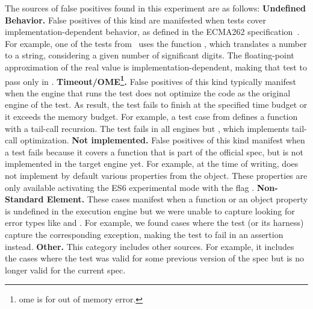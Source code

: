 \documentclass[10pt,conference,anonymous]{IEEEtran}
\begin{document}
The sources of false positives found in this experiment are as
follows: \textbf{Undefined Behavior.} False positives of this kind are
manifested when tests cover implementation-dependent behavior, as
defined in the ECMA262 specification~\cite{ecmas262-spec}. For
example, one of the tests from \jerry\ uses the function
, which translates a number to
a string, considering a given number of significant digits. The
floating-point approximation of the real value is
implementation-dependent, making that test to pass only in
\chakra. \textbf{Timeout/OME\footnote{ome is for out of memory
    error.}.} False positives of this kind typically manifest when the
engine that runs the test does not optimize the code as the original
engine of the test. As result, the test fails to finish at the
specified time budget or it exceeds the memory budget. For example, a
test case from \jsc{} defines a function with a tail-call
recursion. The test fails in all engines but \jsc{}, which implements
tail-call optimization. \textbf{Not implemented.} False positives of
this kind manifest when a test fails because it covers a function that
is part of the official spec, but is not implemented in the target
engine yet. For example, at the time of writing, \chakra{} does not
implement by default various properties from the 
object. These properties are only available activating the ES6
experimental mode with the flag .
\textbf{Non-Standard Element.} These cases manifest when a function or
an object property is undefined in the execution engine but we were
unable to capture looking for error types like 
and . For example, we found cases where the test (or
its harness) capture the corresponding exception, making the test to
fail in an assertion instead.  \textbf{Other.} This category includes
other sources. For example, it includes the cases where the test was
valid for some previous version of the spec but is no longer valid for
the current spec.

\end{document}

